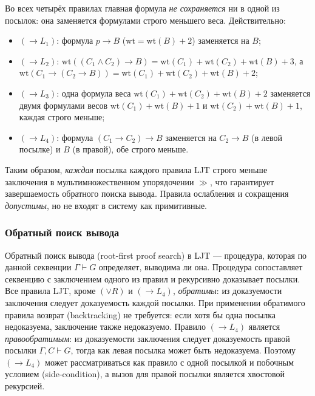 \documentclass[14pt, russian]{scrartcl}
\begin{document}
Во всех четырёх правилах главная формула \emph{не сохраняется} ни в одной из
посылок: она заменяется формулами строго меньшего веса. Действительно:
\begin{itemize}
\item $(\rightarrow L_1)$: формула $p \rightarrow B$ ($\mathrm{wt} = \mathrm{wt}(B) + 2$)
  заменяется на $B$;
\item $(\rightarrow L_2)$: $\mathrm{wt}((C_1 \land C_2) \rightarrow B)
  = \mathrm{wt}(C_1) + \mathrm{wt}(C_2) + \mathrm{wt}(B) + 3$, а
  $\mathrm{wt}(C_1 \rightarrow (C_2 \rightarrow B))
  = \mathrm{wt}(C_1) + \mathrm{wt}(C_2) + \mathrm{wt}(B) + 2$;
\item $(\rightarrow L_3)$: одна формула веса
  $\mathrm{wt}(C_1) + \mathrm{wt}(C_2) + \mathrm{wt}(B) + 2$ заменяется двумя
  формулами весов $\mathrm{wt}(C_1) + \mathrm{wt}(B) + 1$ и
  $\mathrm{wt}(C_2) + \mathrm{wt}(B) + 1$, каждая строго меньше;
\item $(\rightarrow L_4)$: формула $(C_1 \rightarrow C_2) \rightarrow B$ заменяется
  на $C_2 \rightarrow B$ (в левой посылке) и $B$ (в правой), обе строго меньше.
\end{itemize}

Таким образом, \emph{каждая} посылка каждого правила LJT строго меньше
заключения в мультимножественном упорядочении $\gg$, что гарантирует завершаемость
обратного поиска вывода. Правила ослабления и сокращения \emph{допустимы}, но
не входят в систему как примитивные.

\subsubsection{Обратный поиск вывода}

Обратный поиск вывода (root-first proof search) в LJT --- процедура, которая по
данной секвенции $\Gamma \vdash G$ определяет, выводима ли она. Процедура
сопоставляет секвенцию с заключением одного из правил и рекурсивно доказывает
посылки. Все правила LJT, кроме $(\lor R)$ и $(\rightarrow L_4)$,
\emph{обратимы}: из доказуемости заключения следует доказуемость каждой посылки.
При применении обратимого правила возврат (backtracking) не требуется: если
хотя бы одна посылка недоказуема, заключение также недоказуемо. Правило
$(\rightarrow L_4)$ является \emph{правообратимым}: из доказуемости заключения
следует доказуемость правой посылки $\Gamma, C \vdash G$, тогда как левая посылка
может быть недоказуема. Поэтому $(\rightarrow L_4)$ может рассматриваться как
правило с одной посылкой и побочным условием (side-condition), а вызов для правой
посылки является хвостовой рекурсией.
\end{document}
